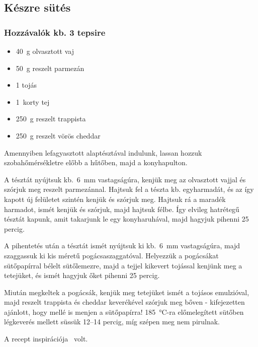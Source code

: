 \subsection*{Készre sütés}
\subsubsection*{Hozzávalók kb. 3 tepsire}
\begin{itemize}
    \item \qty{40}{\g} olvasztott vaj
    \item \qty{50}{\g} reszelt parmezán
    \item \num{1} tojás
    \item \qty{1}{korty} tej
    \item \qty{250}{\g} reszelt trappista
    \item \qty{250}{\g} reszelt vörös cheddar
\end{itemize}

Amennyiben lefagyasztott alaptésztával indulunk, lassan hozzuk szobahőmérsékletre előbb a hűtőben, majd a konyhapulton.

A tésztát nyújtsuk kb.~\qty{6}{\mm} vastagságúra, kenjük meg az olvasztott vajjal és szórjuk meg reszelt parmezánnal. Hajtsuk fel a tészta kb. egyharmadát, és az így kapott új felületet szintén kenjük és szórjuk meg. Hajtsuk rá a maradék harmadot, ismét kenjük és szórjuk, majd hajtsuk félbe. Így elvileg hatrétegű tésztát kapunk, amit takarjunk le egy konyharuhával, majd hagyjuk pihenni \num{25} percig.

A pihentetés után a tésztát ismét nyújtsuk ki kb.~\qty{6}{\mm} vastagságúra, majd szaggassuk ki kis méretű pogácsaszaggatóval. Helyezzük a pogácsákat sütőpapírral bélelt sütőlemezre, majd a tejjel kikevert tojással kenjünk meg a tetejüket, és ismét hagyjuk őket pihenni \num{25} percig.

Miután megkeltek a pogácsák, kenjük meg tetejüket ismét a tojásos emulzióval, majd reszelt trappista és cheddar keverékével szórjuk meg bőven - kifejezetten ajánlott, hogy mellé is menjen a sütőpapírra! \qty{185}{\celsius}-ra előmelegített sütőben légkeverés mellett süssük \numrange{12}{14} percig, míg szépen meg nem pirulnak.

A recept inspirációja~\cite{szabi_pogi} volt.
